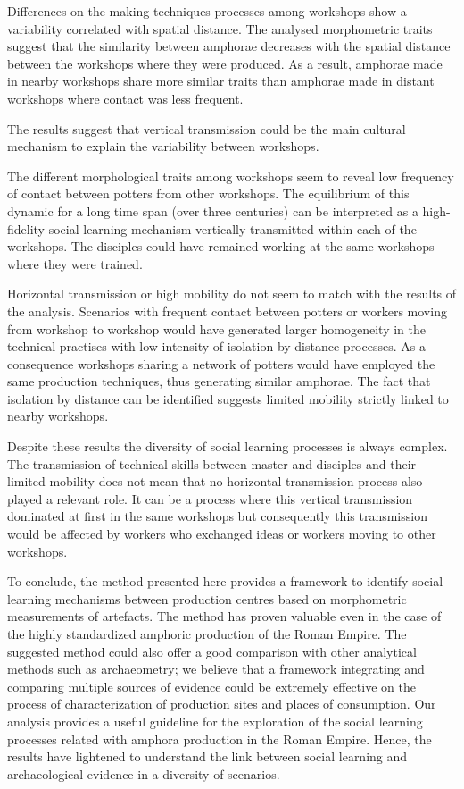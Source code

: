 \documentclass[review]{elsarticle}
\begin{document}
Differences on the making techniques processes among workshops show a variability correlated with spatial distance. The analysed morphometric traits suggest that the similarity between amphorae decreases with the spatial distance between the workshops where they were produced. As a result, amphorae made in nearby workshops share more similar traits than amphorae made in distant workshops where contact was less frequent.

The results suggest that vertical transmission could be the main cultural mechanism to explain the variability between workshops. 

The different morphological traits among workshops seem to reveal low frequency of contact between potters from other workshops. The equilibrium of this dynamic for a long time span (over three centuries) can be interpreted as a high-fidelity social learning mechanism vertically transmitted within each of the workshops. The disciples could have remained working at the same workshops where they were trained. 

Horizontal transmission or high mobility do not seem to match with the results of the analysis. Scenarios with frequent contact between potters or workers moving from workshop to workshop would have generated larger homogeneity in the technical practises with low intensity of isolation-by-distance processes. As a consequence workshops sharing a network of potters would have employed the same production techniques, thus generating similar amphorae. The fact that isolation by distance can be identified suggests limited mobility strictly linked to nearby workshops.

Despite these results the diversity of social learning processes is always complex. The transmission of technical skills between master and disciples and their limited mobility does not mean that no horizontal transmission process also played a relevant role. It can be a process where this vertical transmission dominated at first in the same workshops but consequently this transmission would be affected by workers who exchanged ideas or workers moving to other workshops. 

To conclude, the method presented here provides a framework to identify social learning mechanisms between production centres based on morphometric measurements of artefacts. The method has proven valuable even in the case of the highly standardized amphoric production of the Roman Empire. The suggested method could also offer a good comparison with other analytical methods such as archaeometry; we believe that a framework integrating and comparing multiple sources of evidence could be extremely effective on the process of characterization of production sites and places of consumption. Our analysis provides a useful guideline for the exploration of the social learning processes related with amphora production in the Roman Empire. Hence, the results have lightened to understand the link between social learning and archaeological evidence in a diversity of scenarios. 
\end{document}
